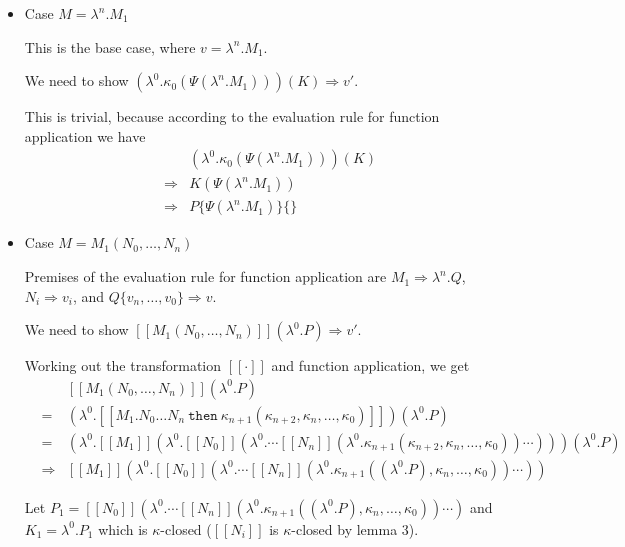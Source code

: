 \documentclass[a4paper,11pt]{article}
\begin{document}
\begin{itemize}
\item{Case $M = \lambda^{n}.M_{1}$}

  This is the base case, where $v = \lambda^{n}.M_{1}$.

  We need to show $(\lambda^{0}.\kappa_{0}(\Psi(\lambda^{n}.M_{1}))) (K)
  \Rightarrow v'$.

  This is trivial, because according to the evaluation rule for
  function application we have
  \begin{eqnarray*}
   &             & (\lambda^{0}.\kappa_{0}(\Psi(\lambda^{n}.M_{1}))) (K) \\
   & \Rightarrow & K (\Psi(\lambda^{n}.M_{1})) \\
   & \Rightarrow & P\{\Psi(\lambda^{n}.M_{1})\}\{\}
  \end{eqnarray*}

\item{Case $M = M_{1}(N_{0}, \ldots, N_{n})$}

Premises of the evaluation rule for function application are
$M_{1} \Rightarrow \lambda^{n}.Q$, $N_{i} \Rightarrow v_{i}$,
and $Q\{v_{n}, \ldots, v_{0}\} \Rightarrow v$.

We need to show $[\![M_{1}(N_{0}, \ldots, N_{n})]\!](\lambda^{0}.P) \Rightarrow v'$.

Working out the transformation $[\![\cdot]\!]$ and function application,
we get
\begin{eqnarray*}
&   & [\![M_{1}(N_{0}, \ldots, N_{n})]\!] (\lambda^{0}.P) \\
& = & (\lambda^{0}.[\![M_{1}.N_{0} \ldots N_{n} \: \texttt{then} \: \kappa_{n+1}(\kappa_{n+2}, \kappa_{n}, \ldots, \kappa_{0})]\!]) (\lambda^{0}.P) \\
& = & (\lambda^{0}.[\![M_{1}]\!](\lambda^{0}.[\![N_{0}]\!](\lambda^{0}. \cdots [\![N_{n}]\!](\lambda^{0}.\kappa_{n+1}(\kappa_{n+2}, \kappa_{n}, \ldots, \kappa_{0})) \cdots ))) (\lambda^{0}.P) \\
& \Rightarrow & [\![M_{1}]\!](\lambda^{0}.[\![N_{0}]\!](\lambda^{0}. \cdots [\![N_{n}]\!](\lambda^{0}.\kappa_{n+1}((\lambda^{0}.P), \kappa_{n}, \ldots, \kappa_{0})) \cdots ))
\end{eqnarray*}

Let $P_{1} = [\![N_{0}]\!](\lambda^{0}. \cdots [\![N_{n}]\!](\lambda^{0}.\kappa_{n+1}((\lambda^{0}.P), \kappa_{n}, \ldots, \kappa_{0})) \cdots )$ and $K_{1} = \lambda^{0}.P_{1}$ which is $\kappa$-closed ($[\![N_{i}]\!]$ is $\kappa$-closed by lemma 3).


\end{itemize}
\end{document}
